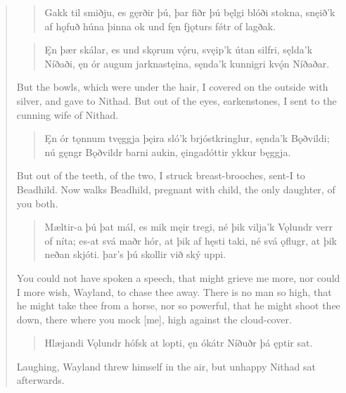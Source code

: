 \begin{verse}

\begin{verse}
\bva Gakk til smiðju, \hld es gęrðir þú,
þar fiðr þú bęlgi \hld blóði stokna,
snęið'k af hǫfuð \hld húna þinna
ok und fęn fjǫturs \hld fǿtr of lagðak. \\%
\end{verse}


\begin{verse}
\bva Ęn þær skálar, \hld es und skǫrum vǫ́ru,
svęip'k útan silfri, \hld sęlda'k Níðaði,
ęn ór augum \hld jarknastęina,
sęnda'k kunnigri \hld kvǫ́n Níðaðar. \\%
\end{verse}

\bvb But the bowls, which were under the hair, I covered on the outside with silver, and gave to Nithad. But out of the eyes, earkenstones, I sent to the cunning wife of Nithad.

\begin{verse}
\bva Ęn ór tǫnnum \hld tvęggja þęira
sló'k brjóstkringlur, \hld sęnda'k Bǫðvildi;
nú gęngr Bǫðvildr \hld barni aukin,
ęingadóttir \hld ykkur bęggja. \\%
\end{verse}

\bvb But out of the teeth, of the two, I struck breast-brooches, sent-I to Beadhild. Now walks Beadhild, pregnant with child, the only daughter, of you both.

\begin{verse}
\bva Mæltir-a þú þat mál, \hld es mik męir tregi,
né þik vilja'k Vǫlundr \hld verr of níta;
es-at svá maðr hór, \hld at þik af hęsti taki,
né svá ǫflugr, \hld at þik neðan skjóti.
þar's þú skollir \hld við ský uppi. \\%
\end{verse}

\bvb You could not have spoken a speech, that might grieve me more, nor could I more wish, Wayland, to chase thee away. There is no man so high, that he might take thee from a horse, nor so powerful, that he might shoot thee down, there where you mock [me], high against the cloud-cover.

\begin{verse}
\bva Hlæjandi Vǫlundr \hld hófsk at lopti,
ęn ókátr Níðuðr \hld þá ęptir sat. \\%
\end{verse}

\bvb Laughing, Wayland threw himself in the air, but unhappy Nithad sat afterwards.


\end{verse}
